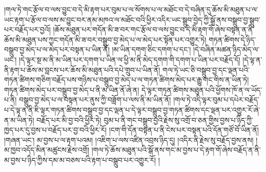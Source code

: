 །གལ་ཏེ་གང་རྩོལ་བ་ལས་བྱུང་བ་དེ་མི་རྟག་པར་བུམ་པ་ལ་སོགས་པ་ལ་མཐོང་བ་དེ་བཞིན་དུ་ཆོས་མི་མཐུན་པ་ལ་ཡང་རྟག་པ་རྩོལ་བ་ལས་མ་བྱུང་བར་ནམ་མཁའ་ལ་མཐོང་བའི་ཕྱིར་འདིར་ཡང་སྒྲུབ་བྱེད་ཀྱི་སྒྲོ་ནས་བསྒྲུབ་བྱ་སྒྲུབ་པར་བརྗོད་པར་བྱའོ། །ཆོས་མཐུན་པར་གདོན་མི་ཟ་བར་གང་རྩོལ་བ་ལས་བྱུང་བ་དེ་མི་རྟག་གོ་ཞེས་བསྟན་ན་ནི་ཆོས་མི་མཐུན་པས་ཀྱང་གདོན་མི་ཟ་བར་བསྒྲུབ་བྱ་མེད་པ་ལ་མེད་པར་སྟོན་པར་འགྱུར་ཏེ། གཏན་ཚིགས་དེ་ཉིད་བསྒྲུབ་བྱ་མེད་པ་ལ་མེད་པར་བསྟན་པ་ཡིན་ནོ། །མ་ཡིན་དགག་ཅིང་དགག་པ་དང་། །དེ་བཞིན་མཚན་ཉིད་མེད་ལ་ཡང་། །དེ་ལྟར་སྔ་མ་ནི་མ་ཡིན་པར་དགག་པ་ཡིན་ལ་ཕྱི་མ་ནི་མེད་དགག་གི་དགག་པ་ཡིན་པར་བརྗོད་དོ། །དེ་ལྟ་ན་ནི་རྟག་པ་ཆོས་མ་བླངས་པར་ཆོས་མི་མཐུན་པའི་དཔེ་གྲུབ་པ་ཡིན་ནོ། གལ་ཏེ་ཡང་ཅི་བསྒྲུབ་བྱ་དང་ལྡན་པའི་གཏན་ཚིགས་གཅིག་བརྗོད་པས་གཉིས་པ་བསྒྲུབ་བྱ་མེད་པ་ལ་གཏན་ཚིགས་མེད་པར་རྒྱུ་གང་གིས་ན་ཡིན་ཏེ། གཏན་ཚིགས་མེད་པར་བསྒྲུབ་བྱ་མེད་པ་ནི་མ་ཡིན་ནོ་ཞེ་ན། དེ་ལྟར་གཏན་ཚིགས་མཐུན་པའི་ཕྱོགས་ཁོ་ན་ལ་ཡོད་པ་ནི། བསྒྲུབ་བྱ་མེད་པ་ལ་བསྟན་པར་ནུས་ཀྱི་བཟློག་པ་ལས་ནི་མ་ཡིན་ནོ། །གལ་ཏེ་འདི་ལྟར་བུམ་པ་དཔེར་བརྗོད་པ་དེ་ལྟ་ན་ནི་ཇི་ལྟར་གཏན་ཚིགས་བསྒྲུབ་བྱ་དང་ལྡན་པ་དེ་ལྟར་བསྒྲུབ་བྱ་གཏན་ཚིགས་དང་ལྡན་པར་འགྱུར་རོ་ཞེ་ན་མ་ཡིན་ཏེ། བརྗོད་པར་མི་བྱ་བའི་ཕྱིར་ཏེ། བུམ་པ་ནི་གང་བསྒྲུབ་བྱའི་རྗེས་སུ་འགྲོ་བ་ཅན་གྱིས་བྱས་པ་ཉིད་ཀྱི་ཁྱད་པར་དུ་བྱས་པ་བརྗོད་པར་བྱ་བའི་ཕྱིར་རོ། །ངག་གི་དོན་བསྟན་པ་ནི་ངེས་པར་བསྟན་པའི་དོན་གཙོ་བོ་ཡིན་ནོ། །གཞན་ཡང་། མ་བྱས་པ་ལ་རྟག་པའམ། །འཇིག་པ་ལས་འཛིན་འབྲས་ཉིད་དུ། །འདིར་ནི་རྗེས་སུ་བརྗོད་བྱས་ནས། །མ་ཁྱབ་འདོད་མིན་མཚུངས་རྗེས་འགྲོ། །གལ་ཏེ་ཆོས་མཐུན་པའི་སྒོ་ནས་གང་མ་བྱས་པ་དེ་རྟག་གོ་ཞེས་བརྗོད་ན་ནི་མ་བྱས་པ་ཉིད་ཀྱིས་དམ་མ་བཅས་པའི་རྟག་པ་བསྒྲུབ་པར་འགྱུར་རོ། །
